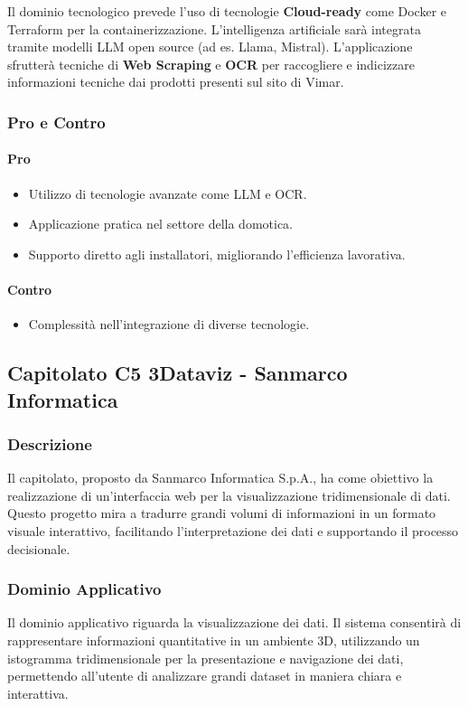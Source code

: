 \documentclass{article}
\begin{document}
Il dominio tecnologico prevede l'uso di tecnologie \textbf{Cloud-ready} 
come Docker e Terraform per la containerizzazione. 
L'intelligenza artificiale sarà integrata tramite modelli LLM open source (ad es. Llama, Mistral). 
L'applicazione sfrutterà tecniche di \textbf{Web Scraping} e \textbf{OCR} per raccogliere e indicizzare 
informazioni tecniche dai prodotti presenti sul sito di Vimar.

\subsubsection{Pro e Contro}

\paragraph{Pro}
\begin{itemize}
    \item Utilizzo di tecnologie avanzate come LLM e OCR.
    \item Applicazione pratica nel settore della domotica.
    \item Supporto diretto agli installatori, migliorando l'efficienza lavorativa.
\end{itemize}

\paragraph{Contro}
\begin{itemize}
    \item Complessità nell'integrazione di diverse tecnologie.
\end{itemize}

\subsection{Capitolato C5 3Dataviz - Sanmarco Informatica}

\subsubsection{Descrizione}
Il capitolato, proposto da Sanmarco Informatica S.p.A., 
ha come obiettivo la realizzazione di un'interfaccia web 
per la visualizzazione tridimensionale di dati.
Questo progetto mira a tradurre grandi volumi di informazioni in un formato visuale interattivo, 
facilitando l'interpretazione dei dati e supportando il processo decisionale.

\subsubsection{Dominio Applicativo}
Il dominio applicativo riguarda la visualizzazione dei dati. 
Il sistema consentirà di rappresentare informazioni quantitative in un ambiente 3D, 
utilizzando un istogramma tridimensionale per la presentazione e navigazione dei dati, 
permettendo all'utente di analizzare grandi dataset in maniera chiara e interattiva.
\end{document}
